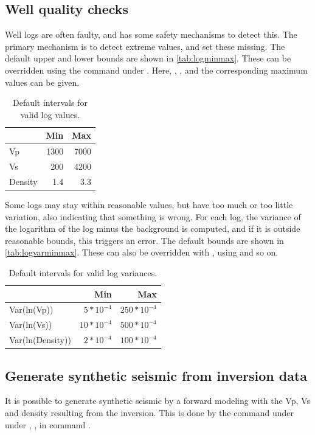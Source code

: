 \subsection{Well quality checks}
Well logs are often faulty, and \crava has some safety mechanisms to
detect this. The primary mechanism is to detect extreme values, and
set these missing. The default upper and lower bounds are shown in
\autoref{tab:logminmax}. These can be overridden using the command
 under
. Here, , ,
 and the corresponding maximum values can be
given. 
\begin{table}
\begin{tabular}{|lrr|}
\hline
& Min & Max \\
\hline
Vp & 1300 & 7000 \\
Vs &  200 & 4200 \\
Density & 1.4 & 3.3
\end{tabular}
\caption{Default intervals for valid log values.\label{tab:logminmax}}
\end{table}


Some logs may stay within reasonable values, but have too much or too
little variation, also indicating that something is wrong. For each
log, the variance of the logarithm of the log minus the background is
computed, and if it is outside reasonable bounds, this triggers an
error. The default bounds are shown in
\autoref{tab:logvarminmax}. These can also be overridden with
, using  and so
on. 
\begin{table}
\begin{tabular}{|lrr|}
\hline
& Min & Max \\
\hline
Var(ln(Vp)) & $5*10^{-4}$ & $250*10^{-4}$ \\
Var(ln(Vs)) & $10*10^{-4}$ & $500*10^{-4}$ \\
Var(ln(Density)) & $2*10^{-4}$ & $100*10^{-4}$ \\
\end{tabular}
\caption{Default intervals for valid log variances.\label{tab:logvarminmax}}
\end{table}

\subsection{Generate synthetic seismic from inversion data}
It is possible to generate synthetic seismic by a forward modeling
with the Vp, Vs and density resulting from the inversion. This is done
by the command   under  under
, ,  in command
. 

